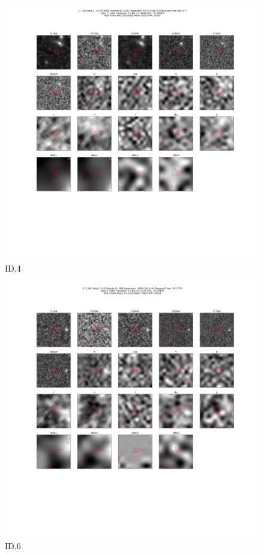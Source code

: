\begin{figure}[tbp]
\centering \includegraphics[width=120mm]{Matched/ASPECS_Cutout_4.png}
\caption{ID.4}
\label{fig:Match_Three}
\end{figure}

\begin{figure}[tbp]
\centering \includegraphics[width=120mm]{Matched/ASPECS_Cutout_6.png}
\caption{ID.6}
\label{fig:Match_Three}
\end{figure}

